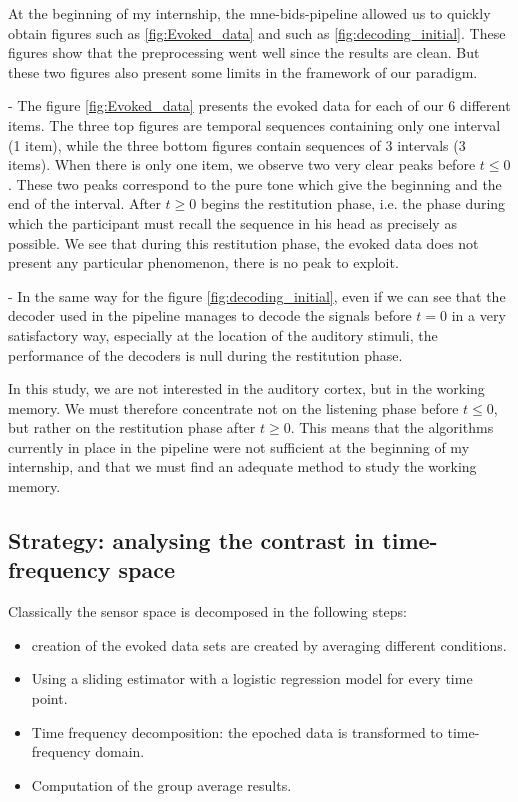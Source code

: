 At the beginning of my internship, the mne-bids-pipeline allowed us to quickly obtain figures such as \ref{fig:Evoked_data} and such as \ref{fig:decoding_initial}. These figures show that the preprocessing went well since the results are clean. But these two figures also present some limits in the framework of our paradigm.

- The figure \ref{fig:Evoked_data} presents the evoked data for each of our 6 different items. The three top figures are temporal sequences containing only one interval (1 item), while the three bottom figures contain sequences of 3 intervals (3 items). 
When there is only one item, we observe two very clear peaks before $t \leq 0$. These two peaks correspond to the pure tone which give the beginning and the end of the interval. After $t \geq 0$ begins the restitution phase, i.e. the phase during which the participant must recall the sequence in his head as precisely as possible. We see that during this restitution phase, the evoked data does not present any particular phenomenon, there is no peak to exploit. 

- In the same way for the figure \ref{fig:decoding_initial}, even if we can see that the decoder used in the pipeline manages to decode the signals before $t=0$ in a very satisfactory way, especially at the location of the auditory stimuli, the performance of the decoders is null during the restitution phase.

In this study, we are not interested in the auditory cortex, but in the working memory. We must therefore concentrate not on the listening phase before $t \leq 0$, but rather on the restitution phase after $t \geq 0$. This means that the algorithms currently in place in the pipeline were not sufficient at the beginning of my internship, and that we must find an adequate method to study the working memory.

\subsection{Strategy: analysing the contrast in time-frequency space}

Classically the sensor space is decomposed in the following steps:
\begin{itemize}
    \item creation of the evoked data sets are created by averaging different conditions.
    \item Using a sliding estimator with a logistic regression model for every time point.
    \item Time frequency decomposition: the epoched data is transformed to time-frequency domain.
    \item Computation of the group average results.
\end{itemize}

